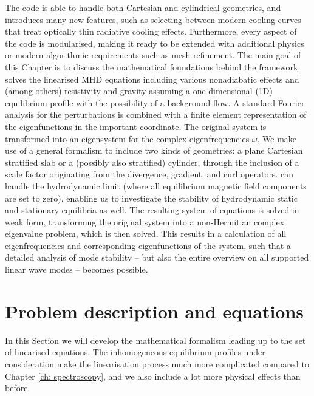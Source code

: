The {\legolas} code is able to handle both Cartesian and cylindrical geometries, and introduces many new features, such as selecting between modern cooling curves that treat optically thin radiative cooling effects. Furthermore, every aspect of the code is modularised, making it ready to be extended with additional physics or modern algorithmic requirements such as mesh refinement. The main goal of this Chapter is to discuss the mathematical foundations behind the {\legolas} framework. {\legolas} solves the linearised MHD equations including various nonadiabatic effects and (among others) resistivity and gravity assuming a one-dimensional (1D) equilibrium profile with the possibility of a background flow. A standard Fourier analysis for the perturbations is combined with a finite element representation of the eigenfunctions in the important coordinate. The original system is transformed into an eigensystem for the complex eigenfrequencies $\omega$. We make use of a general formalism to include two kinds of geometries: a plane Cartesian stratified slab or a (possibly also stratified) cylinder, through the inclusion of a scale factor originating from the divergence, gradient, and curl operators. {\legolas} can handle the hydrodynamic limit (where all equilibrium magnetic field components are set to zero), enabling us to investigate the stability of hydrodynamic static and stationary equilibria as well. The resulting system of equations is solved in weak form, transforming the original system into a non-Hermitian complex eigenvalue problem, which is then solved. This results in a calculation of all eigenfrequencies and corresponding eigenfunctions of the system, such that a detailed analysis of mode stability -- but also the entire overview on all supported linear wave modes -- becomes possible.


\section{Problem description and equations} \label{sec: problem description}
In this Section we will develop the mathematical formalism leading up to the set of linearised equations. The inhomogeneous equilibrium profiles under consideration make the linearisation process much more complicated compared to Chapter \ref{ch: spectroscopy}, and we also include a lot more physical effects than before.

